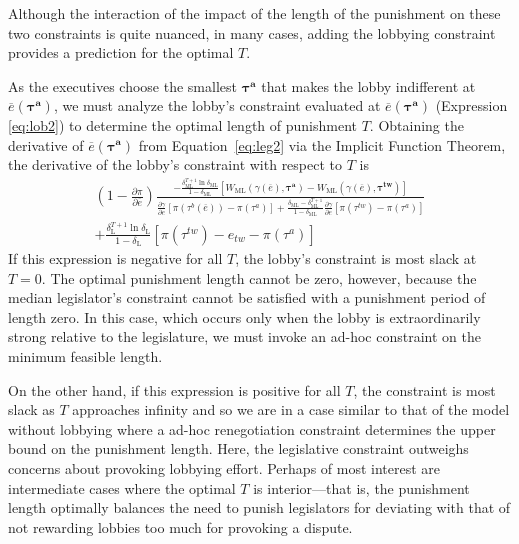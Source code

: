\documentclass[authoryear, review]{elsarticle}
\newcommand{\ov}{\overline}
\newcommand{\bta}{\bm{\tau^a}}
\newcommand{\ga}{\gamma}
\newcommand{\btw}{\bm{\tau^{tw}}}
\newcommand{\de}{\delta}
\begin{document}
Although the interaction of the impact of the length of the punishment on these two constraints is quite nuanced, in many cases, adding the lobbying constraint provides a prediction for the optimal $T$.

As the executives choose the smallest $\bta$ that makes the lobby indifferent at $\ov{e}(\bta)$, we must analyze the lobby's constraint evaluated at $\ov{e}(\bta)$ (Expression \ref{eq:lob2}) to determine the optimal length of punishment $T$. Obtaining the derivative of $\ov{e}(\bta)$ from Equation~\ref{eq:leg2} via the Implicit Function Theorem, the derivative of the lobby's constraint with respect to $T$ is
\begin{multline}
 	\left(1 - \frac{\partial \pi}{\partial \ov{e}} \right) \frac{ -\frac{\de_\text{ML}^{T+1}\ln\de_\text{ML}}{1-\de_\text{ML}}\left[  W_\text{ML}(\ga(\ov{e}),\bta) - W_\text{ML}(\ga(\ov{e}),\btw) \right]}{\frac{\partial \ga}{\partial e} \left[ \pi(\tau^b(\ov{e})) - \pi(\tau^a) \right] + \frac{\de_\text{ML} - \de_\text{ML}^{T+1}}{1-\de_\text{ML}}\frac{\partial \ga}{\partial e} \left[ \pi(\tau^{tw}) - \pi(\tau^a) \right]} \\
	+  \frac{\de_\text{L}^{T+1} \ln \de_\text{L}}{1-\de_\text{L}} \left[ \pi(\tau^{tw}) - e_{tw} -\pi(\tau^a) \right]
 	\label{ine:T}
\end{multline}
If this expression is negative for all $T$, the lobby's constraint is most slack at $T=0$. The optimal punishment length cannot be zero, however, because the median legislator's constraint cannot be satisfied with a punishment period of length zero. In this case, which occurs only when the lobby is extraordinarily strong relative to the legislature, we must invoke an ad-hoc constraint on the minimum feasible length.

On the other hand, if this expression is positive for all $T$, the constraint is most slack as $T$ approaches infinity and so we are in a case similar to that of the model without lobbying where a ad-hoc renegotiation constraint determines the upper bound on the punishment length. Here, the legislative constraint outweighs concerns about provoking lobbying effort. Perhaps of most interest are intermediate cases where the optimal $T$ is interior---that is, the punishment length optimally balances the need to punish legislators for deviating with that of not rewarding lobbies too much for provoking a dispute.
\end{document}
